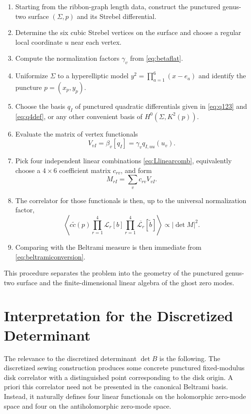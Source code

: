 \documentclass[12pt]{article}
\newcommand{\cL}{\mathcal{L}}
\newcommand{\wt}[1]{\widetilde{#1}}
\newcommand{\ol}[1]{\overline{#1}}
\begin{document}
\begin{enumerate}
\item Starting from the ribbon-graph length data, construct the punctured genus-two surface $(\Sigma,p)$ and its Strebel differential.
\item Determine the six cubic Strebel vertices on the surface and choose a regular local coordinate $u$ near each vertex.
\item Compute the normalization factors $\gamma_v$ from \eqref{eq:betaflat}.
\item Uniformize $\Sigma$ to a hyperelliptic model $y^2=\prod_{a=1}^6(x-e_a)$ and identify the puncture $p=(x_p,y_p)$.
\item Choose the basis $q_I$ of punctured quadratic differentials given in \eqref{eq:q123} and \eqref{eq:q4def}, or any other convenient basis of $H^0(\Sigma,K^2(p))$.
\item Evaluate the matrix of vertex functionals
\begin{equation}
V_{vI}=\beta_v[q_I]=\gamma_v q_{I,uu}(u_v).
\end{equation}
\item Pick four independent linear combinations \eqref{eq:Llinearcomb}, equivalently choose a $4\times 6$ coefficient matrix $c_{rv}$, and form
\begin{equation}
M_{rI}=\sum_v c_{rv}V_{vI}.
\end{equation}
\item The correlator for those functionals is then, up to the universal normalization factor,
\begin{equation}
\left\langle c\wt{c}(p)\prod_{r=1}^4\cL_r[b]\prod_{r=1}^4\ol{\cL_r}[\wt{b}]\right\rangle
\propto |\det M|^2.
\end{equation}
\item Comparing with the Beltrami measure is then immediate from \eqref{eq:beltramiconversion}.
\end{enumerate}

This procedure separates the problem into the geometry of the punctured genus-two surface and the finite-dimensional linear algebra of the ghost zero modes.

\section{Interpretation for the Discretized Determinant}

The relevance to the discretized determinant $\det B$ is the following. The discretized sewing construction produces some concrete punctured fixed-modulus disk correlator with a distinguished point corresponding to the disk origin. A priori this correlator need not be presented in the canonical Beltrami basis. Instead, it naturally defines four linear functionals on the holomorphic zero-mode space and four on the antiholomorphic zero-mode space.
\end{document}
